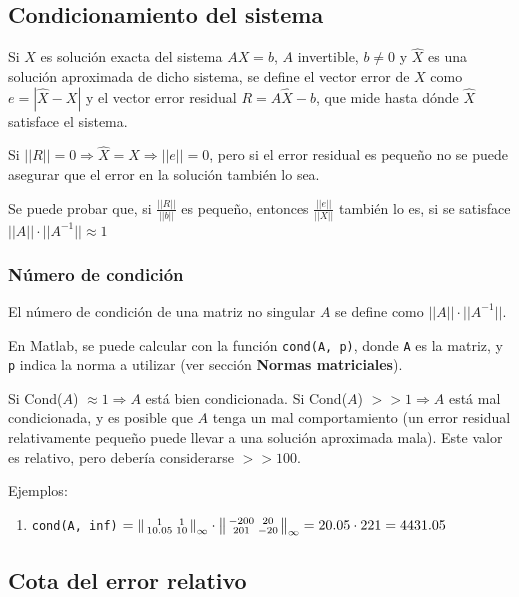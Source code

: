 \documentclass{article}
\begin{document}
\subsection{Condicionamiento del sistema}

Si $X$ es solución exacta del sistema $AX=b$, $A$ invertible, $b\neq0$ y $\hat{X}$ es una solución aproximada de dicho sistema, se define el vector error de $X$ como $e = |\hat{X} - X|$ y el vector error residual $R=A\hat{X}-b$, que mide hasta dónde $\hat{X}$ satisface el sistema.

Si $||R||=0\Rightarrow\hat{X}=X\Rightarrow||e||=0$, pero si el error residual es pequeño no se puede asegurar que el error en la solución también lo sea.

Se puede probar que, si $\frac{||R||}{||b||}$ es pequeño, entonces $\frac{||e||}{||X||}$ también lo es, si se satisface $||A||\cdot||A^{-1}||\approx1$

\subsubsection{Número de condición}

El número de condición de una matriz no singular $A$ se define como $||A||\cdot||A^{-1}||$.

En Matlab, se puede calcular con la función \verb|cond(A, p)|, donde \verb|A| es la matriz, y \verb|p| indica la norma a utilizar (ver sección \textbf{Normas matriciales}).

Si Cond($A$) $\approx1\Rightarrow A$ está bien condicionada. Si Cond($A$) $>> 1\Rightarrow A$ está mal condicionada, y es posible que $A$ tenga un mal comportamiento (un error residual relativamente pequeño puede llevar a una solución aproximada mala). Este valor es relativo, pero debería considerarse $>> 100$.

Ejemplos:
\begin{enumerate}
    \item \verb|cond(A, inf)| $=\begin{Vsmallmatrix}1 & 1\\ 10.05 & 10\end{Vsmallmatrix}_\infty \cdot \begin{Vsmallmatrix}-200 & 20\\ 201 & -20\end{Vsmallmatrix}_\infty = 20.05\cdot221 = 4431.05$
\end{enumerate}

\subsection{Cota del error relativo}
\end{document}
